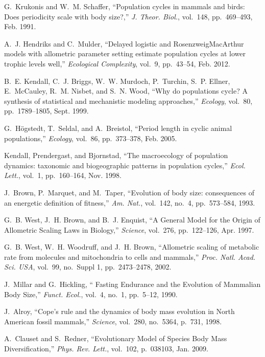\documentclass[11pt]{article}
\begin{document}
\begin{multicols}{2}
{\begin{thebibliography}{10}
G.~Krukonis and W.~M. Schaffer, ``{Population cycles in mammals and birds: Does
  periodicity scale with body size?},'' {\em J. Theor. Biol.}, vol.~148,
  pp.~469--493, Feb. 1991.

A.~J. Hendriks and C.~Mulder, ``{Delayed logistic and
  Rosenzweig{\textendash}MacArthur models with allometric parameter setting
  estimate population cycles at lower trophic levels well},'' {\em Ecological
  Complexity}, vol.~9, pp.~43--54, Feb. 2012.

B.~E. Kendall, C.~J. Briggs, W.~W. Murdoch, P.~Turchin, S.~P. Ellner,
  E.~McCauley, R.~M. Nisbet, and S.~N. Wood, ``{Why do populations cycle? A
  synthesis of statistical and mechanistic modeling approaches},'' {\em
  Ecology}, vol.~80, pp.~1789--1805, Sept. 1999.

G.~H{\"o}gstedt, T.~Seldal, and A.~Breistol, ``{Period length in cyclic animal
  populations},'' {\em Ecology}, vol.~86, pp.~373--378, Feb. 2005.

Kendall, Prendergast, and Bjornstad, ``{The macroecology of population
  dynamics: taxonomic and biogeographic patterns in population cycles},'' {\em
  Ecol. Lett.}, vol.~1, pp.~160--164, Nov. 1998.

J.~Brown, P.~Marquet, and M.~Taper, ``{Evolution of body size: consequences of
  an energetic definition of fitness},'' {\em Am. Nat.}, vol.~142, no.~4,
  pp.~573--584, 1993.

G.~B. West, J.~H. Brown, and B.~J. Enquist, ``{A General Model for the Origin
  of Allometric Scaling Laws in Biology},'' {\em Science}, vol.~276,
  pp.~122--126, Apr. 1997.

G.~B. West, W.~H. Woodruff, and J.~H. Brown, ``{Allometric scaling of metabolic
  rate from molecules and mitochondria to cells and mammals},'' {\em Proc.
  Natl. Acad. Sci. USA}, vol.~99, no.~Suppl 1, pp.~2473--2478, 2002.

J.~Millar and G.~Hickling, ``{ Fasting Endurance and the Evolution of Mammalian
  Body Size},'' {\em Funct. Ecol.}, vol.~4, no.~1, pp.~5--12, 1990.

J.~Alroy, ``{Cope's rule and the dynamics of body mass evolution in North
  American fossil mammals},'' {\em Science}, vol.~280, no.~5364, p.~731, 1998.

A.~Clauset and S.~Redner, ``{Evolutionary Model of Species Body Mass
  Diversification},'' {\em Phys. Rev. Lett.}, vol.~102, p.~038103, Jan. 2009.


\end{thebibliography}}
\end{multicols}
\end{document}
